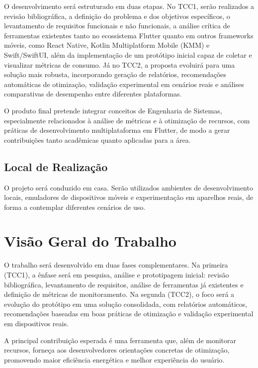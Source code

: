 \documentclass[12pt,a4paper]{article}
\begin{document}
O desenvolvimento será estruturado em duas etapas. No TCC1, serão realizados a revisão bibliográfica, a definição do problema e dos objetivos específicos, o levantamento de requisitos funcionais e não funcionais, a análise crítica de ferramentas existentes tanto no ecossistema Flutter quanto em outros frameworks móveis, como React Native, Kotlin Multiplatform Mobile (KMM) e Swift/SwiftUI, além da implementação de um protótipo inicial capaz de coletar e visualizar métricas de consumo. Já no TCC2, a proposta evoluirá para uma solução mais robusta, incorporando geração de relatórios, recomendações automáticas de otimização, validação experimental em cenários reais e análises comparativas de desempenho entre diferentes plataformas.

O produto final pretende integrar conceitos de Engenharia de Sistemas, especialmente relacionados à análise de métricas e à otimização de recursos, com práticas de desenvolvimento multiplataforma em Flutter, de modo a gerar contribuições tanto acadêmicas quanto aplicadas para a área.
\subsection{Local de Realização}
O projeto será conduzido em casa. Serão utilizados ambientes de desenvolvimento locais, emuladores de dispositivos móveis e experimentação em aparelhos reais, de forma a contemplar diferentes cenários de uso.

\section{Visão Geral do Trabalho}

O trabalho será desenvolvido em duas fases complementares. Na primeira (TCC1), a ênfase será em pesquisa, análise e prototipagem inicial: revisão bibliográfica, levantamento de requisitos, análise de ferramentas já existentes e definição de métricas de monitoramento. Na segunda (TCC2), o foco será a evolução do protótipo em uma solução consolidada, com relatórios automáticos, recomendações baseadas em boas práticas de otimização e validação experimental em dispositivos reais.  

A principal contribuição esperada é uma ferramenta que, além de monitorar recursos, forneça aos desenvolvedores orientações concretas de otimização, promovendo maior eficiência energética e melhor experiência do usuário.
\end{document}
